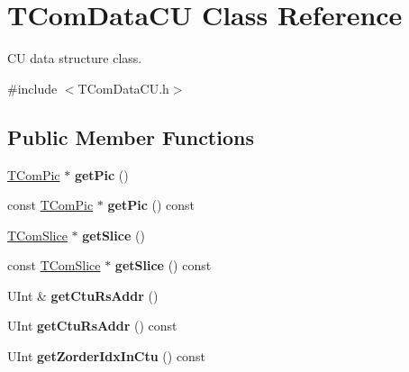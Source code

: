 \hypertarget{class_t_com_data_c_u}{}\section{T\+Com\+Data\+CU Class Reference}
\label{class_t_com_data_c_u}


CU data structure class.  




{\ttfamily \#include $<$T\+Com\+Data\+C\+U.\+h$>$}

\subsection*{Public Member Functions}
\begin{DoxyCompactItemize}
\item 
\mbox{\label{class_t_com_data_c_u_a6df3f3e27fde8739ec004863aebeaba3}} 
\hyperlink{class_t_com_pic}{T\+Com\+Pic} $\ast$ {\bfseries get\+Pic} ()
\item 
\mbox{\label{class_t_com_data_c_u_af7148dd91e3e705245abf206f0a6731f}} 
const \hyperlink{class_t_com_pic}{T\+Com\+Pic} $\ast$ {\bfseries get\+Pic} () const
\item 
\mbox{\label{class_t_com_data_c_u_a5a3d856cf3cd8764aa8c0e0310feb287}} 
\hyperlink{class_t_com_slice}{T\+Com\+Slice} $\ast$ {\bfseries get\+Slice} ()
\item 
\mbox{\label{class_t_com_data_c_u_af7a437165dd8b902b4f1721b86af5322}} 
const \hyperlink{class_t_com_slice}{T\+Com\+Slice} $\ast$ {\bfseries get\+Slice} () const
\item 
\mbox{\label{class_t_com_data_c_u_a7579d6fb9dfe80bfa140499672575121}} 
U\+Int \& {\bfseries get\+Ctu\+Rs\+Addr} ()
\item 
\mbox{\label{class_t_com_data_c_u_a5bba377428873b0e700d9ba88792bb4b}} 
U\+Int {\bfseries get\+Ctu\+Rs\+Addr} () const
\item 
\mbox{\label{class_t_com_data_c_u_a0ae66f49a161ee1c923b6a7c765e2712}} 
U\+Int {\bfseries get\+Zorder\+Idx\+In\+Ctu} () const
\item 

\end{DoxyCompactItemize}
